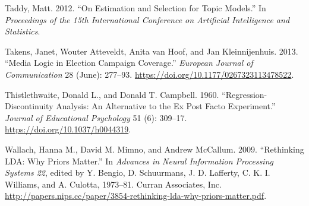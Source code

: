 \documentclass[
  12pt,
]{article}
\newlength{\cslhangindent}
\newlength{\cslentryspacingunit} %
\newenvironment{CSLReferences}[2] %
 {%
  \setlength{\parindent}{0pt}
  \ifodd #1
  \let\oldpar\par
  \def\par{\hangindent=\cslhangindent\oldpar}
  \fi
  \setlength{\parskip}{#2\cslentryspacingunit}
 }%
 {}
\begin{document}
\begin{CSLReferences}{1}{0}
\leavevmode{}%
Taddy, Matt. 2012. {``On Estimation and Selection for Topic Models.''}
In \emph{Proceedings of the 15th International Conference on Artificial
Intelligence and Statistics}.

\leavevmode{}%
Takens, Janet, Wouter Atteveldt, Anita van Hoof, and Jan Kleinnijenhuis.
2013. {``Media Logic in Election Campaign Coverage.''} \emph{European
Journal of Communication} 28 (June): 277--93.
\url{https://doi.org/10.1177/0267323113478522}.

\leavevmode{}%
Thistlethwaite, Donald L., and Donald T. Campbell. 1960.
{``Regression-Discontinuity Analysis: An Alternative to the Ex Post
Facto Experiment.''} \emph{Journal of Educational Psychology} 51 (6):
309--17. \url{https://doi.org/10.1037/h0044319}.

\leavevmode{}%
Wallach, Hanna M., David M. Mimno, and Andrew McCallum. 2009.
{``Rethinking {LDA}: Why Priors Matter.''} In \emph{Advances in Neural
Information Processing Systems 22}, edited by Y. Bengio, D. Schuurmans,
J. D. Lafferty, C. K. I. Williams, and A. Culotta, 1973--81. Curran
Associates, Inc.
\url{http://papers.nips.cc/paper/3854-rethinking-lda-why-priors-matter.pdf}.

\end{CSLReferences}
\end{document}
